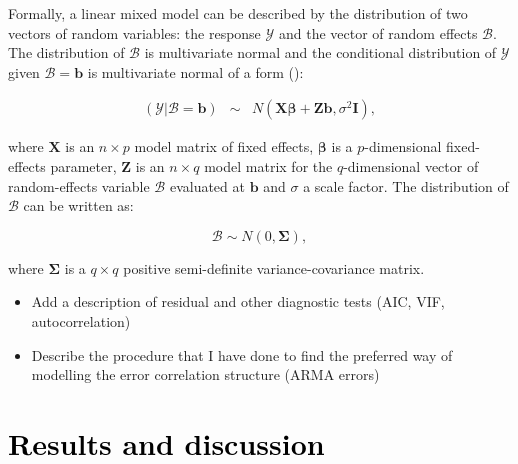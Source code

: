 \documentclass[a4paper,12pt]{article}
\begin{document}
Formally, a linear mixed model can be described by the distribution of two vectors of random variables: the response $\mathscr{Y}$ and the vector of random effects $\mathscr{B}$. The distribution of $\mathscr{B}$ is multivariate normal and the conditional distribution of $\mathscr{Y}$ given $\mathscr{B}=\mathbf{b}$ is multivariate normal of a form (\citealp{bates2010lme4, KERYch9}):




\begin{equation}\label{MixedGeneral}
\begin{array}{lcl}

(\mathscr{Y}|\mathscr{B}=\mathbf{b})& \sim & \mathit{N}(\mathbf{X}\mathbf{\beta}+\mathbf{Z}\mathbf{b},\sigma^2\mathbf{I}),

\end{array}
\end{equation}

where $\mathbf{X}$ is an $n \times p$ model matrix of fixed effects, $\mathbf{\beta}$ is a $p$-dimensional fixed-effects parameter, $\mathbf{Z}$ is an $n \times q$ model matrix for the $q$-dimensional vector of random-effects variable $\mathscr{B}$ evaluated at $\mathbf{b}$ and $\sigma$ a scale factor. The distribution of $\mathscr{B}$ can be written as: 

\begin{equation}\label{ranefDist}
\mathscr{B} \sim \mathit{N}(0,\mathbf{\Sigma}),
\end{equation}

where $\mathbf{\Sigma}$ is a $q \times q$ positive semi-definite variance-covariance matrix.

\color{blue}
\begin{itemize}
\item Add a description of residual and other diagnostic tests (AIC, VIF, autocorrelation)
\item Describe the procedure that I have done to find the preferred way of modelling the  error correlation structure (ARMA errors)
\end{itemize}
\color{black}
\FloatBarrier
	\section{\textcolor{black}{Results and discussion}}\label{Results}
\end{document}
